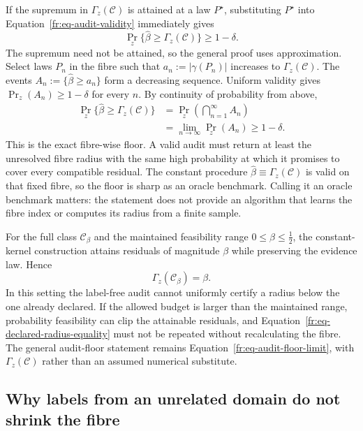 If the supremum in $\Gamma_z(\mathcal C)$ is attained at a law $P^\star$, substituting
$P^\star$ into Equation~\eqref{fr:eq-audit-validity} immediately gives
\begin{equation}
  \Pr_z\{\widehat\beta\ge\Gamma_z(\mathcal C)\}\ge1-\delta.
  \label{fr:eq-audit-floor-attained}
\end{equation}
The supremum need not be attained, so the general proof uses approximation.  Select laws $P_n$ in
the fibre such that $a_n:=|\gamma(P_n)|$ increases to $\Gamma_z(\mathcal C)$.  The events
$A_n:=\{\widehat\beta\ge a_n\}$ form a decreasing sequence.  Uniform validity gives
$\Pr_z(A_n)\ge1-\delta$ for every $n$.  By continuity of probability from above,
\begin{align}
  \Pr_z\{\widehat\beta\ge\Gamma_z(\mathcal C)\}
  &=\Pr_z\left(\bigcap_{n=1}^{\infty}A_n\right) \\
  &=\lim_{n\to\infty}\Pr_z(A_n)
  \ge1-\delta.
  \label{fr:eq-audit-floor-limit}
\end{align}
This is the exact fibre-wise floor.  A valid audit must return at least the unresolved fibre radius
with the same high probability at which it promises to cover every compatible residual.  The
constant procedure $\widehat\beta\equiv\Gamma_z(\mathcal C)$ is valid on that fixed fibre, so the
floor is sharp as an oracle benchmark.  Calling it an oracle benchmark matters: the statement does
not provide an algorithm that learns the fibre index or computes its radius from a finite sample.

For the full class $\mathcal C_\beta$ and the maintained feasibility range
$0\le\beta\le\tfrac12$, the constant-kernel construction attains residuals of magnitude $\beta$
while preserving the evidence law.  Hence
\begin{equation}
  \Gamma_z(\mathcal C_\beta)=\beta.
  \label{fr:eq-declared-radius-equality}
\end{equation}
In this setting the label-free audit cannot uniformly certify a radius below the one already
declared.  If the allowed budget is larger than the maintained range, probability feasibility can
clip the attainable residuals, and Equation~\eqref{fr:eq-declared-radius-equality} must not be
repeated without recalculating the fibre.  The general audit-floor statement remains
Equation~\eqref{fr:eq-audit-floor-limit}, with $\Gamma_z(\mathcal C)$ rather than an assumed
numerical substitute.

\subsection{Why labels from an unrelated domain do not shrink the fibre}
\label{fr:subsec-wrong-domain-labels}

